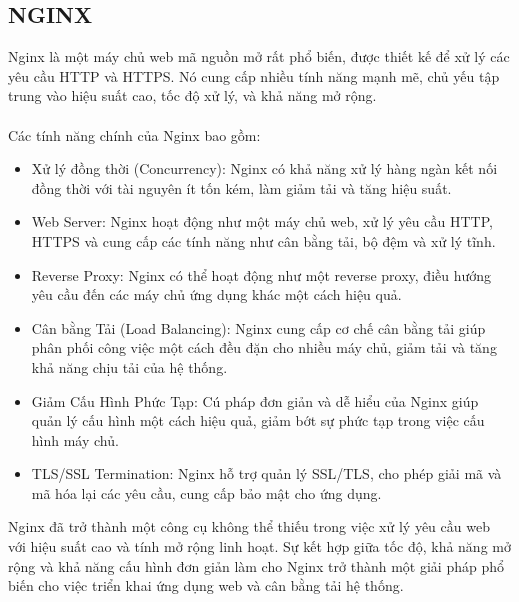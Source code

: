 \subsection{NGINX}
Nginx là một máy chủ web mã nguồn mở rất phổ biến, được thiết kế để xử lý các yêu cầu HTTP và HTTPS. Nó cung cấp nhiều tính năng mạnh mẽ, chủ yếu tập trung vào hiệu suất cao, tốc độ xử lý, và khả năng mở rộng.\\
\\
Các tính năng chính của Nginx bao gồm:
\begin{itemize}
    \item Xử lý đồng thời (Concurrency): Nginx có khả năng xử lý hàng ngàn kết nối đồng thời với tài nguyên ít tốn kém, làm giảm tải và tăng hiệu suất.

    \item Web Server: Nginx hoạt động như một máy chủ web, xử lý yêu cầu HTTP, HTTPS và cung cấp các tính năng như cân bằng tải, bộ đệm và xử lý tĩnh.

    \item Reverse Proxy: Nginx có thể hoạt động như một reverse proxy, điều hướng yêu cầu đến các máy chủ ứng dụng khác một cách hiệu quả.

    \item Cân bằng Tải (Load Balancing): Nginx cung cấp cơ chế cân bằng tải giúp phân phối công việc một cách đều đặn cho nhiều máy chủ, giảm tải và tăng khả năng chịu tải của hệ thống.

    \item Giảm Cấu Hình Phức Tạp: Cú pháp đơn giản và dễ hiểu của Nginx giúp quản lý cấu hình một cách hiệu quả, giảm bớt sự phức tạp trong việc cấu hình máy chủ.

    \item  TLS/SSL Termination: Nginx hỗ trợ quản lý SSL/TLS, cho phép giải mã và mã hóa lại các yêu cầu, cung cấp bảo mật cho ứng dụng.
\end{itemize}
Nginx đã trở thành một công cụ không thể thiếu trong việc xử lý yêu cầu web với hiệu suất cao và tính mở rộng linh hoạt. Sự kết hợp giữa tốc độ, khả năng mở rộng và khả năng cấu hình đơn giản làm cho Nginx trở thành một giải pháp phổ biến cho việc triển khai ứng dụng web và cân bằng tải hệ thống.
